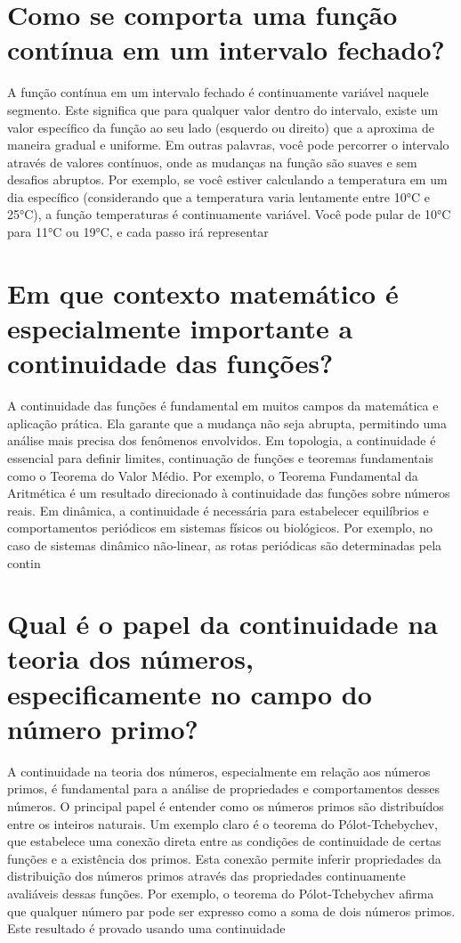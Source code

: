 \documentclass[11pt,a4paper]{article}
\begin{document}
\section{Como se comporta uma função contínua em um intervalo fechado?}
A função contínua em um intervalo fechado é continuamente variável naquele segmento. Este significa que para qualquer valor dentro do intervalo, existe um valor específico da função ao seu lado (esquerdo ou direito) que a aproxima de maneira gradual e uniforme. Em outras palavras, você pode percorrer o intervalo através de valores contínuos, onde as mudanças na função são suaves e sem desafios abruptos. Por exemplo, se você estiver calculando a temperatura em um dia específico (considerando que a temperatura varia lentamente entre 10°C e 25°C), a função temperaturas é continuamente variável. Você pode pular de 10°C para 11°C ou 19°C, e cada passo irá representar

\section{Em que contexto matemático é especialmente importante a continuidade das funções?}
A continuidade das funções é fundamental em muitos campos da matemática e aplicação prática. Ela garante que a mudança não seja abrupta, permitindo uma análise mais precisa dos fenômenos envolvidos. Em topologia, a continuidade é essencial para definir limites, continuação de funções e teoremas fundamentais como o Teorema do Valor Médio. Por exemplo, o Teorema Fundamental da Aritmética é um resultado direcionado à continuidade das funções sobre números reais. Em dinâmica, a continuidade é necessária para estabelecer equilíbrios e comportamentos periódicos em sistemas físicos ou biológicos. Por exemplo, no caso de sistemas dinâmico não-linear, as rotas periódicas são determinadas pela contin

\section{Qual é o papel da continuidade na teoria dos números, especificamente no campo do número primo?}
A continuidade na teoria dos números, especialmente em relação aos números primos, é fundamental para a análise de propriedades e comportamentos desses números. O principal papel é entender como os números primos são distribuídos entre os inteiros naturais. Um exemplo claro é o teorema do Pólot-Tchebychev, que estabelece uma conexão direta entre as condições de continuidade de certas funções e a existência dos primos. Esta conexão permite inferir propriedades da distribuição dos números primos através das propriedades continuamente avaliáveis dessas funções. Por exemplo, o teorema do Pólot-Tchebychev afirma que qualquer número par pode ser expresso como a soma de dois números primos. Este resultado é provado usando uma continuidade
\end{document}
